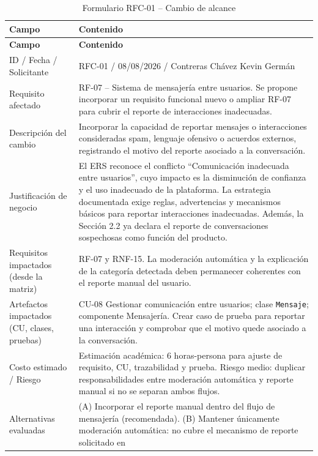 \documentclass[journal,onecolumn]{IEEEtran}
\begin{document}
	\begin{longtable}{L{4.0cm} L{9.5cm}}
		\caption{Formulario RFC-01 -- Cambio de alcance}\label{tab:rfc01}\\
		\toprule
		\textbf{Campo} & \textbf{Contenido} \\
		\midrule
		\endfirsthead
		\toprule
		\textbf{Campo} & \textbf{Contenido} \\
		\midrule
		\endhead
		\bottomrule
		\endfoot
		ID / Fecha / Solicitante &
		RFC-01 / 08/08/2026 / Contreras Chávez Kevin Germán \\
		\addlinespace
		Requisito afectado &
		RF-07 -- Sistema de mensajería entre usuarios. Se propone incorporar un requisito funcional
		nuevo o ampliar RF-07 para cubrir el reporte de interacciones inadecuadas. \\
		\addlinespace
		Descripción del cambio &
		Incorporar la capacidad de reportar mensajes o interacciones consideradas spam, lenguaje
		ofensivo o acuerdos externos, registrando el motivo del reporte asociado a la conversación. \\
		\addlinespace
		Justificación de negocio &
		El ERS reconoce el conflicto ``Comunicación inadecuada entre usuarios'', cuyo impacto es la
		disminución de confianza y el uso inadecuado de la plataforma. La estrategia documentada exige
		reglas, advertencias y mecanismos básicos para reportar interacciones inadecuadas. Además, la
		Sección 2.2 ya declara el reporte de conversaciones sospechosas como función del producto. \\
		\addlinespace
		Requisitos impactados (desde la matriz) &
		RF-07 y RNF-15. La moderación automática y la explicación de la categoría detectada deben
		permanecer coherentes con el reporte manual del usuario. \\
		\addlinespace
		Artefactos impactados (CU, clases, pruebas) &
		CU-08 Gestionar comunicación entre usuarios; clase \texttt{Mensaje}; componente Mensajería.
		Crear caso de prueba para reportar una interacción y comprobar que el motivo quede asociado a
		la conversación. \\
		\addlinespace
		Costo estimado / Riesgo &
		Estimación académica: 6 horas-persona para ajuste de requisito, CU, trazabilidad y prueba.
		Riesgo medio: duplicar responsabilidades entre moderación automática y reporte manual si no se
		separan ambos flujos. \\
		\addlinespace
		Alternativas evaluadas &
		(A) Incorporar el reporte manual dentro del flujo de mensajería (recomendada).
		(B) Mantener únicamente moderación automática: no cubre el mecanismo de reporte solicitado en

\end{longtable}
\end{document}
